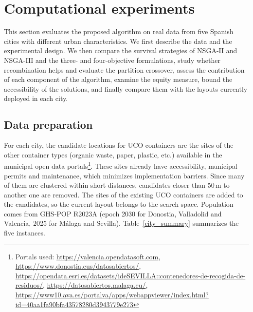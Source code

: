 \section{Computational experiments}
\label{computational_experiments}
This section evaluates the proposed algorithm on real data from five Spanish cities with different urban characteristics. We first describe the data and the experimental design. We then compare the survival strategies of NSGA-II and NSGA-III and the three- and four-objective formulations, study whether recombination helps and evaluate the partition crossover, assess the contribution of each component of the algorithm, examine the equity measure, bound the accessibility of the solutions, and finally compare them with the layouts currently deployed in each city.

\subsection{Data preparation}
For each city, the candidate locations for UCO containers are the sites of the other container types (organic waste, paper, plastic, etc.) available in the municipal open data portals\footnote{Portals used: \url{https://valencia.opendatasoft.com}, \url{https://www.donostia.eus/datosabiertos/}, \url{https://opendata.esri.es/datasets/ideSEVILLA::contenedores-de-recogida-de-residuos/}, \url{https://datosabiertos.malaga.eu/}, \url{https://www10.ava.es/portalva/apps/webappviewer/index.html?id=40aa1fa90bfa43578280d3943779e273}}. These sites already have accessibility, municipal permits and maintenance, which minimizes implementation barriers. Since many of them are clustered within short distances, candidates closer than 50\,m to another one are removed. The sites of the existing UCO containers are added to the candidates, so the current layout belongs to the search space. Population comes from GHS-POP R2023A (epoch 2030 for Donostia, Valladolid and Valencia, 2025 for Málaga and Sevilla). Table~\ref{city_summary} summarizes the five instances.

